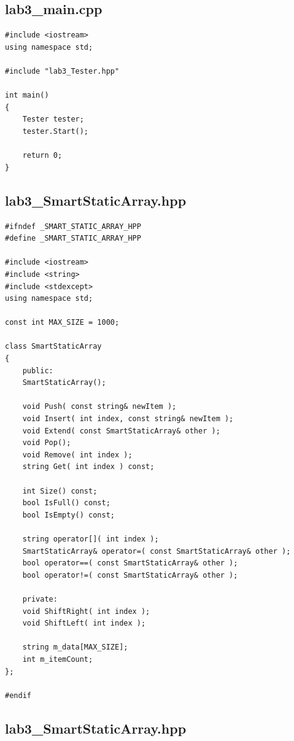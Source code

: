 \documentclass[a4paper,12pt]{book}
\begin{document}
\subsection*{lab3\_main.cpp}

\begin{lstlisting}[style=code]
#include <iostream>
using namespace std;

#include "lab3_Tester.hpp"

int main()
{
    Tester tester;
    tester.Start();

    return 0;
}  
\end{lstlisting}

\subsection*{lab3\_SmartStaticArray.hpp}

\begin{lstlisting}[style=code]
#ifndef _SMART_STATIC_ARRAY_HPP
#define _SMART_STATIC_ARRAY_HPP

#include <iostream>
#include <string>
#include <stdexcept>
using namespace std;

const int MAX_SIZE = 1000;

class SmartStaticArray
{
    public:
    SmartStaticArray();

    void Push( const string& newItem );
    void Insert( int index, const string& newItem );
    void Extend( const SmartStaticArray& other );
    void Pop();
    void Remove( int index );
    string Get( int index ) const;

    int Size() const;
    bool IsFull() const;
    bool IsEmpty() const;

    string operator[]( int index );
    SmartStaticArray& operator=( const SmartStaticArray& other );
    bool operator==( const SmartStaticArray& other );
    bool operator!=( const SmartStaticArray& other );

    private:
    void ShiftRight( int index );
    void ShiftLeft( int index );

    string m_data[MAX_SIZE];
    int m_itemCount;
};

#endif
\end{lstlisting}

\subsection*{lab3\_SmartStaticArray.hpp}
\end{document}
